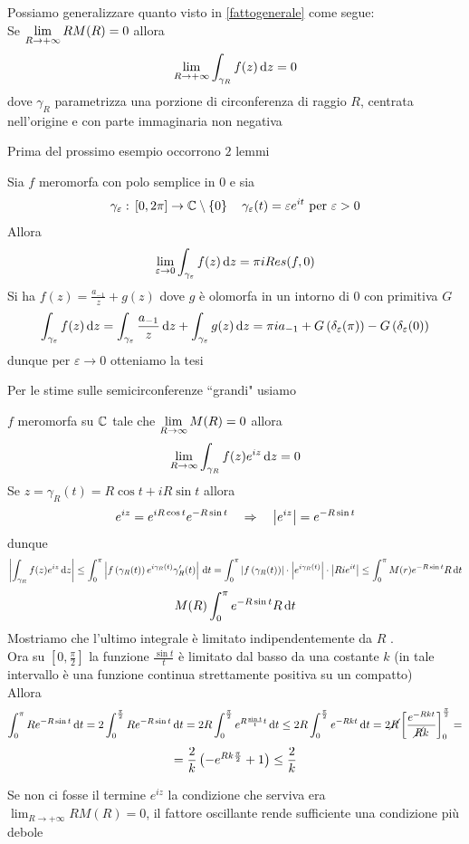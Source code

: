 \begin{oss}Possiamo generalizzare quanto visto in \ref{fattogenerale} come segue:\\
Se $\displaystyle \lim_{R\to +\infty} RM(R) = 0$ allora $$\lim_{R\to +\infty} \int_{\gamma_R} f(z)\, \mathrm{d}z =0$$
dove $\gamma_R$ parametrizza una porzione di  circonferenza di raggio $R$, centrata nell'origine e con parte immaginaria non negativa
\end{oss}
\spazio
Prima del prossimo esempio occorrono $2$ lemmi 
\begin{lem}Sia $f$ meromorfa con polo semplice in $0$ e sia 
$$ \gamma_\varepsilon:\, [0, 2\pi] \to \mathbb{C}\setminus\left\{ 0 \right\} \quad \gamma_\varepsilon(t) = \varepsilon e^{it} \text{ per } \varepsilon>0$$
Allora 
$$ \lim_{\varepsilon\to 0 } \int_{\gamma_\varepsilon} f(z) \, \mathrm{d}z = \pi i Res(f,0)$$
\proof Si ha $f(z) = \frac{a_{-1}}{z} +g(z)$ dove $g$ \`e olomorfa in un intorno di $0$ con primitiva $G$
$$ \int_{\gamma_\varepsilon} f(z) \, \mathrm{d}z = \int_{\gamma_\varepsilon} \frac{a_{-1}}{z}\, \mathrm{d}z + \int_{\gamma_\varepsilon} g(z) \, \mathrm{d}z = \pi i a_{-1} + G\left( \delta_\varepsilon(\pi) \right) - G\left( \delta_\varepsilon(0) \right)$$ 
dunque per $\varepsilon\to 0$ otteniamo la tesi
\end{lem}
\spazio
Per le stime sulle semicirconferenze ``grandi" usiamo 
\begin{lem}$f$ meromorfa su $\mathbb{C}$ tale che $\displaystyle \lim_{R\to \infty} M(R)=0$ allora 
$$ \lim_{R\to \infty }\int_{\gamma_R} f(z)  e^{iz}\, \mathrm{d}z =0$$
\proof Se $z=\gamma_R(t)=R \cos t + i R \sin t $ allora 
$$ e^{iz} =e^{iR\cos t } e^{-R\sin t } \quad \Rightarrow \quad \left\vert e^{iz} \right\vert =e^{-R\sin t }$$ 
dunque 
$$ \left\vert \int_{\gamma_R} f(z) e^{iz} \, \mathrm{d}z  \right\vert \leq \int_0^\pi \left\vert f\left( \gamma_R(t) \right) e^{i\gamma_R(t)} \gamma'_R(t) \right\vert \, \mathrm{d}t =\int_0^\pi \left\vert f\left( \gamma_R(t) \right) \right\vert \cdot \left\vert e^{i\gamma_R(t)} \right\vert \cdot \left\vert  R i e^{it} \right\vert \leq \int_0^\pi M(r) e^{-R\sin t }  R \, \mathrm{d}t $$
$$ M(R) \int_0^\pi e^{-R\sin t } R \, \mathrm{d}t $$
Mostriamo che l'ultimo integrale \`e limitato indipendentemente da $R$ .\\
Ora su $\left[ 0, \frac{\pi}{2}\right]$ la funzione $\frac{\sin t }{t}$ \`e limitato dal basso da una costante $k$ (in tale intervallo \`e una funzione continua strettamente positiva su un compatto)\\
Allora 
$$ \int_0^\pi R e^{-R\sin t} \, \mathrm{d}t = 2\int_0^{\frac{\pi}{2}} Re^{-R\sin t } \, \mathrm{d}t = 2R \int_0^{\frac{\pi}{2}} e^{R \frac{\sin t}{t} t } \, \mathrm{d}t \leq 2 R \int_0^{\frac{\pi}{2}} e^{-Rkt} \, \mathrm{d}t = 2 \cancel{R} \left[ \frac{e^{-Rkt}}{\cancel{R}k} \right]_0^{\frac{\pi}{2}} = $$
$$ = \frac{2}{k}\left( -e^{Rk\frac{\pi}{2}}+1 \right) \leq \frac{2}{k}$$

\begin{oss}Se non ci fosse il termine $e^{iz}$ la condizione che serviva era $\lim_{R \to  +\infty} R M(R)=0$, il fattore oscillante rende sufficiente una condizione pi\`u debole
\end{oss}
\end{lem}

